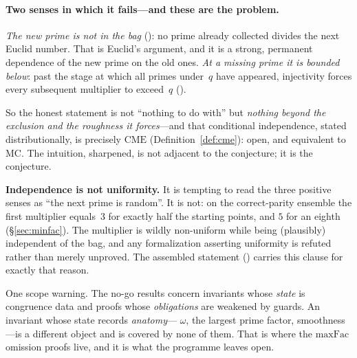 \paragraph{Two senses in which it fails---and these are the problem.}
\emph{The new prime is not in the bag}
(): no prime
already collected divides the next Euclid number.  That is Euclid's
argument, and it is a strong, permanent dependence of the new prime on
the old ones.  \emph{At a missing prime it is bounded below}: past the
stage at which all primes under~$q$ have appeared, injectivity forces
every subsequent multiplier to exceed~$q$
().

So the honest statement is not ``nothing to do with'' but
\emph{nothing beyond the exclusion and the roughness it forces}---and
that conditional independence, stated distributionally, is precisely
$\mathrm{CME}$ (Definition~\ref{def:cme}): open, and equivalent to MC\@.  The intuition, sharpened, is not
adjacent to the conjecture; it is the conjecture.

\begin{aside}
\textbf{Independence is not uniformity.}  It is tempting to read the
three positive senses as ``the next prime is random''.  It is not:
on the correct-parity ensemble the first multiplier equals~$3$ for
exactly half the starting points, and $5$ for an eighth
(\S\ref{sec:minfac}).  The multiplier is wildly non-uniform while being
(plausibly) independent of the bag, and any formalization asserting
uniformity is refuted rather than merely unproved.  The assembled
statement
()
carries this clause for exactly that reason.
\end{aside}

\noindent
One scope warning.  The no-go results concern invariants whose
\emph{state} is congruence data and proofs whose \emph{obligations} are
weakened by guards.  An invariant whose state records \emph{anatomy}---
$\omega$, the largest prime factor, smoothness---is a different object
and is covered by none of them.  That is where the $\mathrm{maxFac}$
omission proofs live, and it is what the programme leaves open.
